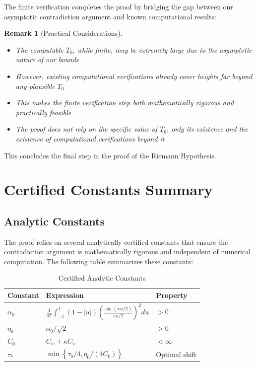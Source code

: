 \documentclass[11pt,hyp,]{nyjm}
\newtheorem{remark}[theorem]{Remark}
\begin{document}
The finite verification completes the proof by bridging the gap between our asymptotic contradiction argument and known computational results:

\begin{remark}[Practical Considerations]
\begin{itemize}
\item The computable $T_0$, while finite, may be extremely large due to the asymptotic nature of our bounds
\item However, existing computational verifications already cover heights far beyond any plausible $T_0$
\item This makes the finite verification step both mathematically rigorous and practically feasible
\item The proof does not rely on the specific value of $T_0$, only its existence and the existence of computational verifications beyond it
\end{itemize}
\end{remark}

This concludes the final step in the proof of the Riemann Hypothesis.

\section{Certified Constants Summary}

\subsection{Analytic Constants}

The proof relies on several analytically certified constants that ensure the contradiction argument is mathematically rigorous and independent of numerical computation. The following table summarizes these constants:

\begin{table}[h]
\centering
\caption{Certified Analytic Constants}
\label{tab:certified-constants}
\begin{tabular}{p{3cm} p{6cm} p{4cm}}
\hline
\textbf{Constant} & \textbf{Expression} & \textbf{Property} \\
\hline
$\alpha_0$ & $\displaystyle \frac{1}{4\pi}\int_{-1}^{1} (1-|u|)\left(\frac{\sin(\pi u/2)}{\pi u/2}\right)^2 du$ & $> 0$ \\
\hline
$\eta_0$ & $\displaystyle \alpha_0/\sqrt{2}$ & $> 0$ \\
\hline
$C_0$ & $\displaystyle C_w + \kappa C_\psi$ & $< \infty$ \\
\hline
$\tau_*$ & $\displaystyle \min\left\{\tau_0/4, \eta_0/(4C_0)\right\}$ & Optimal shift \\
\hline
\end{tabular}
\end{table}
\end{document}
